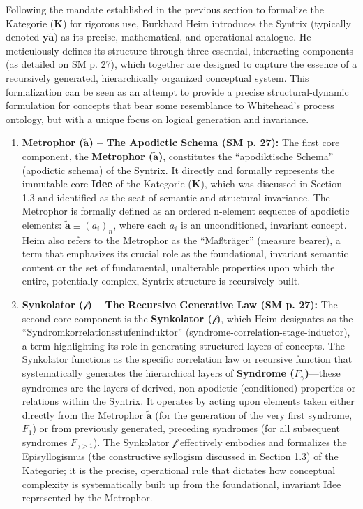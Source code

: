 \documentclass[12pt]{article}
\newcommand{\q}[1]{\enquote{#1}}
\newcommand{\kategorie}{\bm{K}}
\newcommand{\syntrix}{\bm{y\widetilde{a}}}
\newcommand{\metrophor}{\bm{\widetilde{a}}}
\newcommand{\synkolator}{\mathcal{f}}
\newcommand{\syndrom}{F} %
\begin{document}
Following the mandate established in the previous section to formalize the Kategorie (\(\kategorie\)) for rigorous use, Burkhard Heim introduces the Syntrix (typically denoted \( \syntrix \)) as its precise, mathematical, and operational analogue. He meticulously defines its structure through three essential, interacting components (as detailed on SM p. 27), which together are designed to capture the essence of a recursively generated, hierarchically organized conceptual system. This formalization can be seen as an attempt to provide a precise structural-dynamic formulation for concepts that bear some resemblance to Whitehead's process ontology, but with a unique focus on logical generation and invariance.

\begin{enumerate}
    \item \textbf{Metrophor (\( \metrophor \)) – The Apodictic Schema (SM p. 27):}
    The first core component, the \textbf{Metrophor (\( \metrophor \))}, constitutes the \q{apodiktische Schema} (apodictic schema) of the Syntrix. It directly and formally represents the immutable core \textbf{Idee} of the Kategorie (\(\kategorie\)), which was discussed in Section 1.3 and identified as the seat of semantic and structural invariance. The Metrophor is formally defined as an ordered n-element sequence of apodictic elements: \( \metrophor \equiv (a_i)_n \), where each \(a_i\) is an unconditioned, invariant concept. Heim also refers to the Metrophor as the \q{Maßträger} (measure bearer), a term that emphasizes its crucial role as the foundational, invariant semantic content or the set of fundamental, unalterable properties upon which the entire, potentially complex, Syntrix structure is recursively built.

    \item \textbf{Synkolator (\( \synkolator \)) – The Recursive Generative Law (SM p. 27):}
    The second core component is the \textbf{Synkolator (\( \synkolator \))}, which Heim designates as the \q{Syndromkorrelationsstufeninduktor} (syndrome-correlation-stage-inductor), a term highlighting its role in generating structured layers of concepts. The Synkolator functions as the specific correlation law or recursive function that systematically generates the hierarchical layers of \textbf{Syndrome (\( \syndrom_\gamma \))}—these syndromes are the layers of derived, non-apodictic (conditioned) properties or relations within the Syntrix. It operates by acting upon elements taken either directly from the Metrophor \( \metrophor \) (for the generation of the very first syndrome, \( \syndrom_1 \)) or from previously generated, preceding syndromes (for all subsequent syndromes \( \syndrom_{\gamma>1} \)). The Synkolator \( \synkolator \) effectively embodies and formalizes the Episyllogismus (the constructive syllogism discussed in Section 1.3) of the Kategorie; it is the precise, operational rule that dictates how conceptual complexity is systematically built up from the foundational, invariant Idee represented by the Metrophor.


\end{enumerate}
\end{document}
